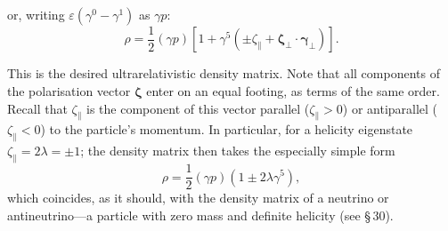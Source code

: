 or, writing $\varepsilon(\gamma^0 - \gamma^1)$ as $\gamma p$:
\begin{equation}
\rho = \frac{1}{2}(\gamma p)[1 + \gamma^5(\pm\zeta_\| + \boldsymbol{\zeta}_\perp\cdot\boldsymbol{\gamma}_\perp)].
\tag{29.21}
\end{equation}

This is the desired ultrarelativistic density matrix. Note that all components of the polarisation vector $\boldsymbol{\zeta}$ enter on an equal footing, as terms of the same order. Recall that $\zeta_\|$ is the component of this vector parallel ($\zeta_\| > 0$) or antiparallel ($\zeta_\| < 0$) to the particle's momentum. In particular, for a helicity eigenstate $\zeta_\| = 2\lambda = \pm 1$; the density matrix then takes the especially simple form
\begin{equation}
\rho = \frac{1}{2}(\gamma p)(1 \pm 2\lambda\gamma^5),
\tag{29.22}
\end{equation}
which coincides, as it should, with the density matrix of a neutrino or antineutrino---a particle with zero mass and definite helicity (see \S\,30).
